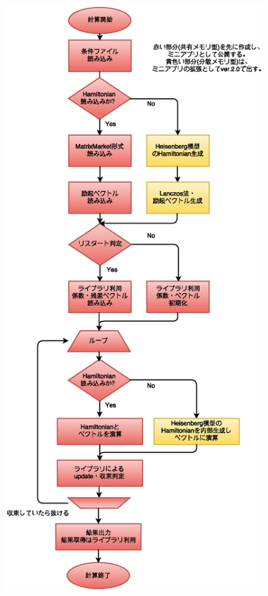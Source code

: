 \documentclass[12pt,titlepage]{jarticle}
\begin{document}
\begin{figure}[htbp]
\begin{center}
	\includegraphics[width=12cm,clip]{KrylovSoft_ver.0.1.eps}
	\label{Fig:CalcFlow}
\end{center}
\end{figure}
\end{document}
